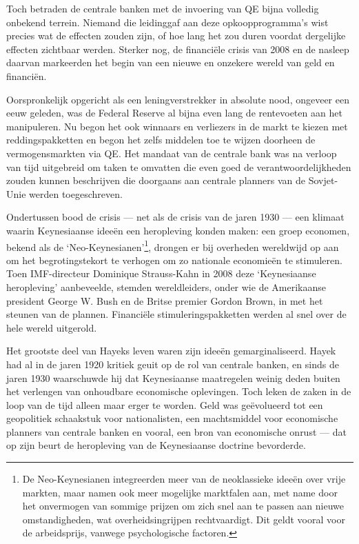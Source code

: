 \documentclass[
  a5paper,
  smalldemyvopaper,11pt,twoside,onecolumn,openright,extrafontsizes]{memoir}
\begin{document}
Toch betraden de centrale banken met de invoering van QE bijna volledig
onbekend terrein. Niemand die leidinggaf aan deze opkoopprogramma's wist
precies wat de effecten zouden zijn, of hoe lang het zou duren voordat
dergelijke effecten zichtbaar werden. Sterker nog, de financiële crisis
van 2008 en de nasleep daarvan markeerden het begin van een nieuwe en
onzekere wereld van geld en financiën.

Oorspronkelijk opgericht als een leningverstrekker in absolute nood,
ongeveer een eeuw geleden, was de Federal Reserve al bijna even lang de
rentevoeten aan het manipuleren. Nu begon het ook winnaars en verliezers
in de markt te kiezen met reddingspakketten en begon het zelfs middelen
toe te wijzen doorheen de vermogensmarkten via QE. Het mandaat van de
centrale bank was na verloop van tijd uitgebreid om taken te omvatten
die even goed de verantwoordelijkheden zouden kunnen beschrijven die
doorgaans aan centrale planners van de Sovjet-Unie werden toegeschreven.

Ondertussen bood de crisis --- net als de crisis van de jaren 1930 ---
een klimaat waarin Keynesiaanse ideeën een heropleving konden maken: een
groep economen, bekend als de `Neo-Keynesianen'\footnote{De
  Neo-Keynesianen integreerden meer van de neoklassieke ideeën over
  vrije markten, maar namen ook meer mogelijke marktfalen aan, met name
  door het onvermogen van sommige prijzen om zich snel aan te passen aan
  nieuwe omstandigheden, wat overheidsingrijpen rechtvaardigt. Dit geldt
  vooral voor de arbeidsprijs, vanwege psychologische factoren.},
drongen er bij overheden wereldwijd op aan om het begrotingstekort te
verhogen om zo nationale economieën te stimuleren. Toen IMF-directeur
Dominique Strauss-Kahn in 2008 deze `Keynesiaanse heropleving'
aanbeveelde, stemden wereldleiders, onder wie de Amerikaanse president
George W. Bush en de Britse premier Gordon Brown, in met het steunen van
de plannen. Financiële stimuleringspakketten werden al snel over de hele
wereld uitgerold.

Het grootste deel van Hayeks leven waren zijn ideeën gemarginaliseerd.
Hayek had al in de jaren 1920 kritiek geuit op de rol van centrale
banken, en sinds de jaren 1930 waarschuwde hij dat Keynesiaanse
maatregelen weinig deden buiten het verlengen van onhoudbare economische
oplevingen. Toch leken de zaken in de loop van de tijd alleen maar erger
te worden. Geld was geëvolueerd tot een geopolitiek schaakstuk voor
nationalisten, een machtsmiddel voor economische planners van centrale
banken en vooral, een bron van economische onrust --- dat op zijn beurt
de heropleving van de Keynesiaanse doctrine bevorderde.
\end{document}
